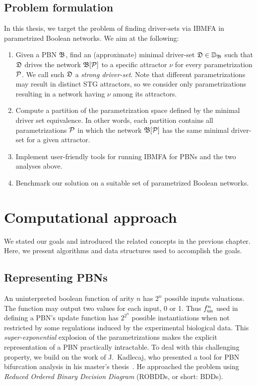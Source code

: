 \documentclass[
	digital, oneside, nosansbold, nocolorbold, nolot, nolof
]{fithesis4}
\theoremstyle{definition}
\theoremstyle{definition}
\begin{document}
\section{Problem formulation}
In this thesis, we target the problem of finding driver-sets via IBMFA in
parametrized Boolean networks. We aim at the following:
\begin{enumerate}
    \item Given a PBN $\mathfrak{B}$, find an (approximate) minimal driver-set
        $\mathfrak{D} \in \mathbb{D}_{\mathfrak{B}}$ such that $\mathfrak{D}$ drives the
        network $\mathfrak{B}[\mathcal{P}]$ to a specific attractor $\nu$ for every
        parametrization $\mathcal{P}$. We call such $\mathfrak{D}$ a \emph{strong
        driver-set}. Note that different parametrizations may result in
        distinct STG attractors, so we consider only parametrizations resulting
        in a network having $\nu$ among its attractors.
    \item Compute a partition of the parametrization space defined by the
        minimal driver set equivalence. In other words, each partition contains
        all parametrizations $\mathcal{P}$ in which the network
        $\mathfrak{B}[\mathcal{P}]$ has the same minimal driver-set for a given
        attractor.
    \item Implement user-friendly tools for running IBMFA for PBNs and the two
        analyses above.
    \item Benchmark our solution on a suitable set of parametrized Boolean
        networks.
\end{enumerate}

\chapter{Computational approach}

We stated our goals and introduced the related concepts in the previous
chapter. Here, we present algorithms and data structures used to accomplish the
goals.

\section{Representing PBNs}

An uninterpreted boolean function of arity $n$ has $2^n$ possible inputs
valuations. The function may output two values for each input, 0 or 1. Thus
$f_{\textrm{un}}^n$ used in defining a PBN's update function has $2^{2^n}$ possible
instantiations when not restricted by some regulations induced by the
experimental biological data. This \emph{super-exponential} explosion of the
parametrizations makes the explicit representation of a PBN practically
intractable. To deal with this challenging property, we build on the work of
J.~Kadlecaj, who presented a tool for PBN bifurcation analysis in his master's
thesis~\cite{kadlecaj_thesis}. He approached the problem using \emph{Reduced
Ordered Binary Decision Diagram} (ROBDDs, or short: BDDs).
\end{document}
